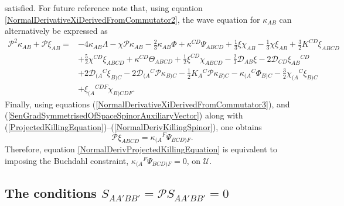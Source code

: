 \documentclass[10pt,a4paper]{article}
\theoremstyle{plain}
\begin{document}
satisfied. For future reference note that, using equation
\eqref{NormalDerivativeXiDerivedFromCommutator2}, the wave equation for
$\kappa_{AB}$ can alternatively be expressed as
\begin{align}
\mathcal{P}^{2}\kappa_{AB}+\mathcal{P}\xi_{AB}
=&-4\kappa_{AB}\Lambda-\chi\mathcal{P}\kappa_{AB} - \tfrac{2}{3}
\kappa_{AB} \Phi + \kappa^{CD} \Psi_{ABCD} + \tfrac{1}{3} \xi
\chi_{AB} - \tfrac{1}{3} \chi \xi_{AB} + \tfrac{3}{2} K^{CD}
\xi_{ABCD} \nonumber \\ & + \tfrac{5}{2} \chi^{CD} \xi_{ABCD} +
\kappa^{CD} \Theta_{ABCD} + \tfrac{1}{2} \xi^{CD} \chi_{ABCD} -
\tfrac{2}{3} \mathcal{D}_{AB}\xi - 2 \mathcal{D}_{CD}\xi_{AB}{}^{CD}
\nonumber \\ & + 2 \mathcal{D}_{(A}{}^{C}\xi_{B)C} -
2\mathcal{D}_{(A}{}^{C}\mathcal{P}\kappa_{B)C}-\tfrac{1}{2}K_{A}{}^{C}\mathcal{P}\kappa_{B)C}
- \kappa_{(A}{}^{C}\Phi_{B)C} - \tfrac{3}{2} \chi_{(A}{}^{C}\xi_{B)C}
\nonumber \\ & +
\xi_{(A}{}^{CDF}\chi_{B)CDF}. \label{WaveEquationSpaceSpinorUseful}
\end{align}
Finally, using equations (\ref{NormalDerivativeXiDerivedFromCommutator3}), and
 (\ref{SenGradSymmetrisedOfSpaceSpinorAuxiliaryVector}) along
with
(\ref{ProjectedKillingEquation})--(\ref{NormalDerivKillingSpinor}),
one obtains 
\[\mathcal{P}\xi_{ABCD}=\kappa_{(A}{}^F\Psi_{BCD)F}.\]
Therefore, equation \eqref{NormalDerivProjectedKillingEquation} is equivalent
to imposing the Buchdahl constraint, $\kappa_{(A}{}^F\Psi_{BCD)F}=0$, on $\mathcal{U}$.


\subsection{The conditions $S_{AA'BB'}=\mathcal{P} S_{AA'BB'}=0$}
\end{document}
